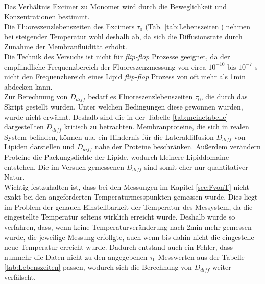 Das Verhältnis Excimer zu Monomer wird durch die Beweglichkeit und  Konzentrationen bestimmt. \cite{Creuwels1996}\\
Die Fluoreszenzlebenszeiten des Excimers $\tau_0$ (Tab. \ref{tab:Lebenszeiten}) nehmen bei steigender Temperatur wohl deshalb ab, da sich die Diffusionsrate durch Zunahme der Membranfluidität erhöht.\\
Die Technik des Versuchs ist nicht für \textit{flip-flop}  Prozesse geeignet, da der empflindliche Frequenzbereich der Fluoreszenzmessung von circa $10^{-10}\text{ bis } 10^{-7}$ s nicht den Frequenzbereich eines Lipid \textit{flip-flop} Prozess von oft mehr als 1min abdecken kann. \\
Zur Berechnung von $D_{diff}$ bedarf  es Fluoreszenzlebenszeiten $\tau_0$, die durch das Skript gestellt wurden. Unter welchen Bedingungen diese gewonnen wurden, wurde nicht erwähnt. Deshalb sind die in der Tabelle \ref{tab:meinetabelle} dargestellten $D_{diff}$ kritisch zu betrachten. Membranproteine, die sich in realen System befinden, können u.a. ein Hindernis für die Lateraldiffusion $D_{diff}$ von Lipiden darstellen und $D_{diff}$ nahe der Proteine beschränken. Außerdem verändern Proteine die Packungsdichte der Lipide, wodurch kleinere Lipiddomaine entstehen. Die im Versuch gemessenen $D_{diff}$ sind somit eher nur quantitativer Natur. \\
Wichtig festzuhalten ist, dass bei den Messungen im Kapitel \ref{sec:FvonT} nicht exakt bei den angeforderten Temperaturmesspunkten gemessen wurde. Dies liegt im Problem der genauen Einstellbarkeit der Temperatur des Messystem, da die eingestellte Temperatur seltens wirklich erreicht wurde. Deshalb wurde so verfahren, dass, wenn keine Temperaturveränderung nach 2min mehr gemessen wurde, die jeweilige Messung erfollgte, auch wenn bis dahin nicht die eingestelle neue Temperatur erreicht wurde. Dadurch entstand auch ein Fehler, dass nunmehr die Daten nicht zu den angegebenen $\tau_0$ Messwerten aus der Tabelle \ref{tab:Lebenszeiten} passen, wodurch sich die Berechnung von  $D_{diff}$ weiter verfälscht.

